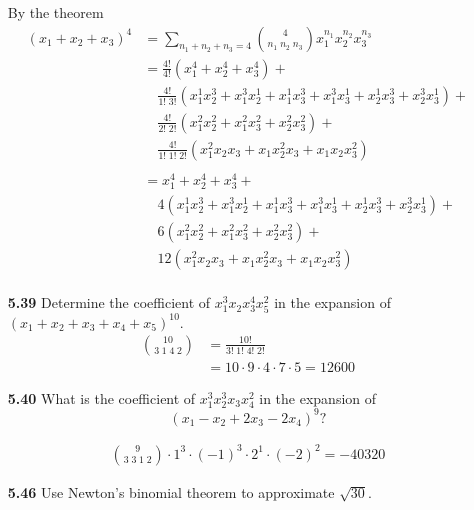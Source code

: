 \documentclass[12pt]{article}
\begin{document}
\begin{enumerate}
    By the theorem
    \begin{align*}
    (x_1+x_2+x_3)^4 &= \sum\limits_{n_1+n_2+n_3=4}\binom{4}{n_1\;n_2\;n_3}x_1^{n_1}x_2^{n_2}x_3^{n_3}\\
    &= \frac{4!}{4!}(x_1^4+x_2^4+x_3^4) + \\
    &\quad\frac{4!}{1!\;3!}(x_1^1x_2^3+x_1^3x_2^1+x_1^1x_3^3+x_1^3x_3^1+x_2^1x_3^3+x_2^3x_3^1)+\\
    &\quad\frac{4!}{2!\;2!}(x_1^2x_2^2+x_1^2x_3^2+x_2^2x_3^2)+\\
    &\quad\frac{4!}{1!\;1!\;2!}(x_1^2x_2x_3+x_1x_2^2x_3+x_1x_2x_3^2)\\
    \\
    &= x_1^4+x_2^4+x_3^4 + \\
    &\quad4(x_1^1x_2^3+x_1^3x_2^1+x_1^1x_3^3+x_1^3x_3^1+x_2^1x_3^3+x_2^3x_3^1)+\\
    &\quad6(x_1^2x_2^2+x_1^2x_3^2+x_2^2x_3^2)+\\
    &\quad12(x_1^2x_2x_3+x_1x_2^2x_3+x_1x_2x_3^2)\\
    \end{align*}
    
    \vspace{2\baselineskip}
    \item[\bf 5.39] Determine the coefficient of $x_1^3x_2x_3^4x_5^2$ in the expansion of $(x_1+x_2+x_3+x_4+x_5)^{10}.$\\

    \begin{align*}
        \binom{10}{3\;1\;4\;2} &= \frac{10!}{3!\;1!\;4!\;2!}\\ &=10\cdot9\cdot4\cdot7\cdot5 
        =12600
    \end{align*}
    
    
    \vspace{2\baselineskip}
    \item[\bf 5.40] What is the coefficient of $x_1^3x_2^3x_3x_4^2$ in the expansion of $$(x_1-x_2+2x_3-2x_4)^9?$$
    
    \begin{align*}
        \binom{9}{3\;3\;1\;2}\cdot1^3\cdot(-1)^3\cdot2^1\cdot(-2)^2 = -40320
    \end{align*}
    
    \vspace{2\baselineskip}
    \item[\bf 5.46] Use Newton's binomial theorem to approximate $\sqrt{30}$.
    

\end{enumerate}
\end{document}

